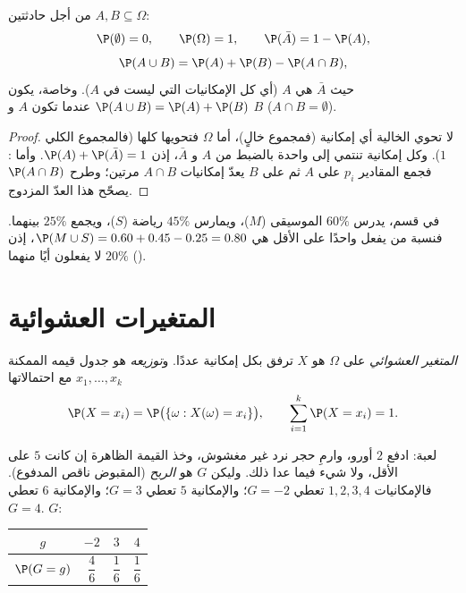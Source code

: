 \begin{proposition}\label{prop:g11:prob:rules}
من أجل حادثتين $A, B \subseteq \Omega$:
\[
\P(\emptyset) = 0, \qquad \P(\Omega) = 1, \qquad
\P(\bar A) = 1 - \P(A),
\]
\[
\P(A \cup B) = \P(A) + \P(B) - \P(A \cap B),
\]
حيث $\bar A$ هي \emph{} $A$ (أي كل الإمكانيات التي ليست في $A$).
وخاصة، يكون $\P(A \cup B) = \P(A) + \P(B)$ عندما تكون $A$ و $B$
\emph{} ($A \cap B = \emptyset$).
\end{proposition}

\begin{proof}
لا تحوي  الخالية أي إمكانية (فمجموع خالٍ)، أما $\Omega$ فتحويها
كلها (فالمجموع الكلي $1$). وكل إمكانية تنتمي إلى واحدة بالضبط من $A$
و $\bar A$، إذن $\P(A) + \P(\bar A) = 1$. وأما : فجمع المقادير $p_i$
على $A$ ثم على $B$ يعدّ إمكانيات $A \cap B$ مرتين؛
وطرح $\P(A \cap B)$ يصحّح هذا العدّ المزدوج.
\end{proof}

\begin{example}
في قسم، يدرس $60\%$ الموسيقى ($M$)، ويمارس $45\%$ رياضة ($S$)، ويجمع
$25\%$ بينهما. فنسبة من يفعل واحدًا على الأقل هي
$\P(M \cup S) = 0.60 + 0.45 - 0.25 = 0.80$، إذن $20\%$ لا يفعلون أيًا منهما
().
\end{example}

\section{المتغيرات العشوائية}

\begin{definition}\label{def:g11:prob:rv}
\emph{المتغير العشوائي} على $\Omega$ هو 
$X$ ترفق بكل إمكانية عددًا. و\emph{توزيعه} هو
جدول قيمه الممكنة $x_1, \dots, x_k$ مع احتمالاتها
\[
\P(X = x_i) = \P\bigl(\{\omega : X(\omega) = x_i\}\bigr),
\qquad
\sum_{i=1}^k \P(X = x_i) = 1 .
\]
\end{definition}

\begin{example}\label{ex:g11:prob:game}
لعبة: ادفع $2$ أورو، وارمِ حجر نرد غير مغشوش، وخذ القيمة الظاهرة إن كانت
$5$ على الأقل، ولا شيء فيما عدا ذلك. وليكن $G$ هو \emph{الربح} (المقبوض
ناقص المدفوع). فالإمكانيات $1, 2, 3, 4$ تعطي $G = -2$؛ والإمكانية $5$
تعطي $G = 3$؛ والإمكانية $6$ تعطي $G = 4$.  $G$:
\begin{center}
\begin{tabular}{c|ccc}
$g$ & $-2$ & $3$ & $4$\\
\hline\rule{0pt}{11pt}%
$\P(G = g)$ & $\dfrac46$ & $\dfrac16$ & $\dfrac16$
\end{tabular}
\end{center}
\end{example}

